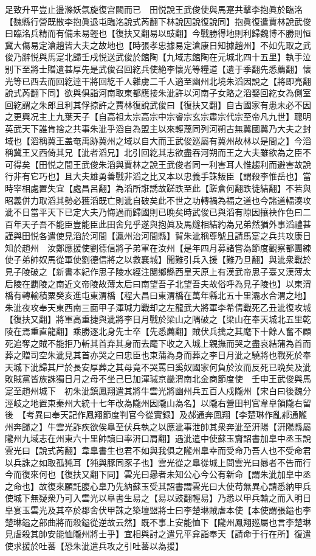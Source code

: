 足致升平豈止盪滌妖氛旋復宫闕而已　田悦說王武俊使與馬寔共擊李抱眞於臨洺【魏縣行營既散李抱眞退屯臨洺說式芮翻下林說因說復說同】抱眞復遣賈林說武俊曰臨洺兵精而有備未易輕也【復扶又翻易以豉翻】今戰勝得地則利歸魏博不勝則恒冀大傷易定滄趙皆大夫之故地也【時張孝忠據易定滄康日知據趙州】不如先取之武俊乃辭悦與馬寔北歸壬戌悦送武俊於館陶【九域志館陶在元城北四十五里】執手泣别下至將士贈遺甚厚先是武俊召回紇兵使絶李懷光等糧道【遺于季翻先悉薦翻】懷光等已西去而回紇逹干將回紇千人雜虜二千人適至幽州北境朱滔因說之【將即亮翻說式芮翻下同】欲與俱詣河南取東都應接朱泚許以河南子女賂之滔娶回紇女為側室回紇謂之朱郎且利其俘掠許之賈林復說武俊曰【復扶又翻】自古國家有患未必不因之更興况主上九葉天子【自高祖太宗高宗中宗睿宗玄宗肅宗代宗至帝凡九世】聰明英武天下誰肯捨之共事朱泚乎滔自為盟主以來輕蔑同列河朔古無冀國冀乃大夫之封域也【滔稱冀王盖奄禹跡冀州之域以自大而王武俊廵屬有冀州故林以是間之】今滔稱冀王又西倚其兄【泚者滔兄】北引回紇其志欲盡吞河朔而王之大夫雖欲為之臣不可得矣【田悦之間王武俊朱滔與賈林之說王武俊者同一利害耳人惟趨利而避害故說行非有它巧也】且大夫雄勇善戰非滔之比又本以忠義手誅叛臣【謂殺李惟岳也】當時宰相處置失宜【處昌呂翻】為滔所誑誘故蹉跌至此【蹉倉何翻跌徒結翻】不若與昭義併力取滔其勢必獲滔既亡則泚自破矣此不世之功轉禍為福之道也今諸道輻湊攻泚不日當平天下已定大夫乃悔過而歸國則已晩矣時武俊已與滔有隙因攘袂作色曰二百年天子吾不能臣豈能臣此田舍兒乎遂與抱眞及馬燧相結約為兄弟然猶外事滔禮甚謹與田悦各遣使見滔於河間【瀛州治河間縣】賀朱泚稱尊號且請馬寔之兵共攻康日知於趙州　汝鄭應援使劉德信將子弟軍在汝州【是年四月募諸嘗為節度觀察都團練使子弟帥奴馬從軍使劉德信將之以救襄城】聞難引兵入援【難乃旦翻】與泚衆戰於見子陵破之【新書本紀作思子陵水經注閺鄉縣西皇天原上有漢武帝思子臺又漢薄太后陵在覇陵之南近文帝陵故薄太后曰南望吾子北望吾夫故俗呼為見子陵也】以東渭橋有轉輸積粟癸亥進屯東渭橋【程大昌曰東渭橋在萬年縣北五十里灞水合渭之地】　朱泚夜攻奉天東西南三面甲子渾瑊力戰却之左龍武大將軍李希倩戰死乙丑泚復攻城【復扶又翻】將軍高重捷與泚將李日月戰於梁山之隅破之【梁山在奉天城北五里乾陵在焉重直龍翻】乘勝逐北身先士卒【先悉薦翻】賊伏兵擒之其麾下十餘人奮不顧死追奪之賊不能拒乃斬其首弃其身而去麾下收之入城上親撫而哭之盡哀結蒲為首而葬之贈司空朱泚見其首亦哭之曰忠臣也束蒲為身而葬之李日月泚之驍將也戰死於奉天城下泚歸其尸於長安厚葬之其母竟不哭罵曰奚奴國家何負於汝而反死已晩矣及泚敗賊黨皆族誅獨日月之母不坐己巳加渾瑊京畿渭南北金商節度使　壬申王武俊與馬寔至趙州城下　初朱泚鎮鳳翔遣其將牛雲光將幽州兵五百人戍隴州【宋白曰後魏分涇岐之地置東秦州大統十七年改為隴州因隴山為名】以隴右營田判官韋臯領隴右留後　【考異曰奉天記作鳳翔節度判官今從實録】及郝通奔鳳翔【李楚琳作亂郝通隴州奔歸之】牛雲光詐疾欲俟臯至伏兵執之以應泚事泄帥其衆奔泚至汧陽【汧陽縣屬隴州九域志在州東六十里帥讀曰率汧口肩翻】遇泚遣中使蘇玉齎詔書加臯中丞玉說雲光曰【說式芮翻】韋臯書生也君不如與我俱之隴州臯幸而受命乃吾人也不受命君以兵誅之如取孤㹠耳【㹠與豚同豕子也】雲光從之臯從城上問雲光曰曏者不告而行今而復來何也【復扶又翻下同】雲光曰曏者未知公心今公有新命【謂朱泚加臯中丞之命也】故復來願託腹心臯乃先納蘇玉受其詔書謂雲光曰大使苟無異心請悉納甲兵使城下無疑衆乃可入雲光以臯書生易之【易以豉翻輕易】乃悉以甲兵輸之而入明日臯宴玉雲光及其卒於郡舍伏甲誅之築壇盟將士曰李楚琳賊虐本使【本使謂張鎰也李楚琳鎰之部曲將而殺鎰從逆故云然】既不事上安能恤下【隴州鳳翔廵屬也言李楚琳見虐殺其帥安能恤隴州將士乎】宜相與討之遣兄平弇詣奉天【請命于行在所】復遣使求援於吐蕃【恐朱泚遣兵攻之引吐蕃以為援】

